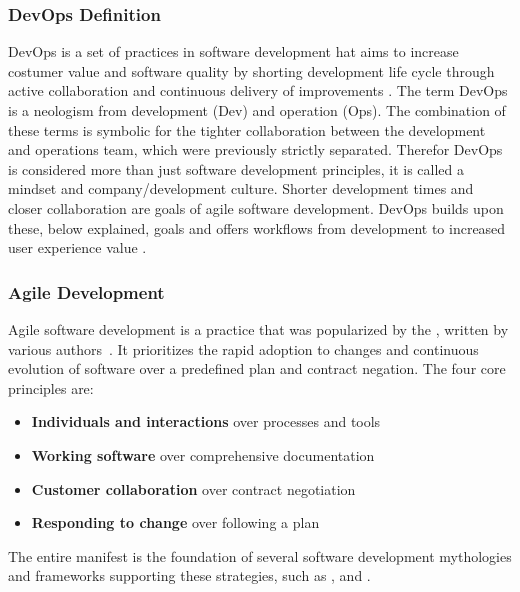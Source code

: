 \documentclass[12pt, a4paper]{article}
\begin{document}
        \subsubsection{DevOps Definition}
        DevOps is a set of practices in software development hat aims to increase costumer value and software quality by shorting development life cycle through active collaboration and continuous delivery of improvements \cite{base_devops}. The term DevOps is a neologism from development (Dev) and operation (Ops). The combination of these terms is symbolic for the tighter collaboration between the development and operations team, which were previously strictly separated. Therefor DevOps is considered more than just software development principles, it is called a mindset and company/development culture. Shorter development times and closer collaboration are goals of agile software development. DevOps builds upon these, below explained, goals and offers workflows from development to increased user experience value \cite{azuredevops}.
        \subsubsection{Agile Development}
        Agile software development is a practice that was popularized by the , written by various authors~\cite{manifesto}. It prioritizes the rapid adoption to changes and continuous evolution of software over a predefined plan and contract negation.
        The four core principles are:

        \begin{itemize}[label=\(\star\)]
            \setlength\itemsep{0em}
            \item \textbf{Individuals and interactions} over processes and tools
            \item \textbf{Working software} over comprehensive documentation
            \item \textbf{Customer collaboration} over contract negotiation
            \item \textbf{Responding to change} over following a plan
        \end{itemize}

        \noindent The entire manifest is the foundation of several software development mythologies and frameworks supporting these strategies, such as ,  and .
\end{document}
